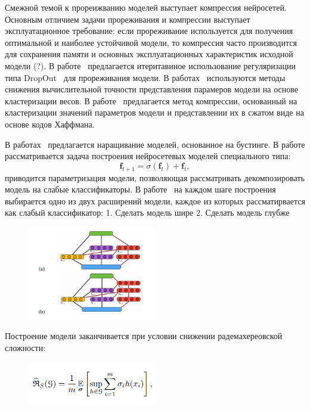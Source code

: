 Смежной темой к прореижванию моделей выступает компрессия нейросетей. Основным отличием задачи прореживания и компрессии выступает эксплуатационное требование: если прореживание используется для получения оптимальной и наиболее устойчивой модели, то компрессия часто производится для сохранения памяти и основных эксплуатационных характеристик исходной модели (?).
В работе~\cite{nvidia_prune}
предлагается итеритавиное использование регуляризации типа DropOut~\cite{dropout} для прореживания модели. 
В работах~\cite{weight_quantization, weight_quantization2} используются методы снижения вычислительной точности представления парамеров модели на основе кластеризации весов.
В работе~\cite{weight_quantization2} предлагается метод компрессии, основанный на кластеризации значений параметров модели и представлении их в сжатом виде на основе кодов Хаффмана.

В работах~\cite{boost_res, adanet} предлагается наращивание моделей, основанное на бустинге. В работе рассматривается задача построения нейросетевых моделей специального типа:
\[
    \mathbf{f}_{t+1} = \sigma(\mathbf{f}_t) + \mathbf{f}_t,
\]
приводится параметризация модели, позволяющая рассматривать декомпозировать модель на слабые классификаторы.
В работе~\cite{adanet} на каждом шаге построения выбирается одно из двух расширений модели, каждое из которых рассматирвается как слабый классификатор:
1. Сделать модель шире
2. Сделать модель глубже
\begin{figure}[H]
\includegraphics[width=0.5\textwidth]{./plots/arch_review_figs/adanet.png}
\end{figure}
Построение модели заканчивается при условии снижении радемахереовской сложности:
\begin{figure}[H]
\includegraphics[width=0.5\textwidth]{./plots/arch_review_figs/rad.png}
\end{figure}



